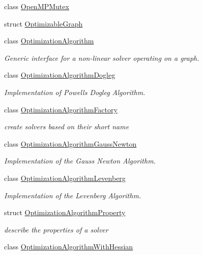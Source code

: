 \begin{DoxyCompactItemize}
class \mbox{\hyperlink{classg2o_1_1_open_m_p_mutex}{Open\+M\+P\+Mutex}}
\item 
struct \mbox{\hyperlink{structg2o_1_1_optimizable_graph}{Optimizable\+Graph}}
\item 
class \mbox{\hyperlink{classg2o_1_1_optimization_algorithm}{Optimization\+Algorithm}}
\begin{DoxyCompactList}\small\item\em Generic interface for a non-\/linear solver operating on a graph. \end{DoxyCompactList}\item 
class \mbox{\hyperlink{classg2o_1_1_optimization_algorithm_dogleg}{Optimization\+Algorithm\+Dogleg}}
\begin{DoxyCompactList}\small\item\em Implementation of Powell\textquotesingle{}s Dogleg Algorithm. \end{DoxyCompactList}\item 
class \mbox{\hyperlink{classg2o_1_1_optimization_algorithm_factory}{Optimization\+Algorithm\+Factory}}
\begin{DoxyCompactList}\small\item\em create solvers based on their short name \end{DoxyCompactList}\item 
class \mbox{\hyperlink{classg2o_1_1_optimization_algorithm_gauss_newton}{Optimization\+Algorithm\+Gauss\+Newton}}
\begin{DoxyCompactList}\small\item\em Implementation of the Gauss Newton Algorithm. \end{DoxyCompactList}\item 
class \mbox{\hyperlink{classg2o_1_1_optimization_algorithm_levenberg}{Optimization\+Algorithm\+Levenberg}}
\begin{DoxyCompactList}\small\item\em Implementation of the Levenberg Algorithm. \end{DoxyCompactList}\item 
struct \mbox{\hyperlink{structg2o_1_1_optimization_algorithm_property}{Optimization\+Algorithm\+Property}}
\begin{DoxyCompactList}\small\item\em describe the properties of a solver \end{DoxyCompactList}\item 
class \mbox{\hyperlink{classg2o_1_1_optimization_algorithm_with_hessian}{Optimization\+Algorithm\+With\+Hessian}}

\end{DoxyCompactItemize}
